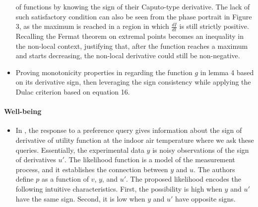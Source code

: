 \documentclass[11pt]{book}
\begin{document}
\begin{itemize}
of functions by knowing the sign of their Caputo-type derivative.
The lack of such satisfactory condition can also be seen from the
phase portrait in Figure 3, as the maximum is reached in a region
in which $\frac{dI}{dt}$ is still strictly positive. Recalling the
Fermat theorem on extremal points becomes an inequality in the non-local
context, justifying that, after the function reaches a maximum and
starts decreasing, the non-local derivative could still be non-negative.
\item Proving monotonicity properties in \cite{datta2021non}
regarding the function $g$ in lemma 4 based on its derivative sign,
then leveraging the sign consistency while applying the Dulac criterion
based on equation 16.
\end{itemize}
\paragraph{Well-being}
\begin{itemize}
\item In \cite{awalgaonkar2019learning},
the response to a preference query gives information about the sign
of derivative of utility function at the indoor air temperature where
we ask these queries. Essentially, the experimental data $y$ is noisy
observations of the sign of derivatives $u'$. The likelihood
function is a model of the measurement process, and it establishes
the connection between $y$ and $u$. The authors define $p$ as a
function of $v$, $y$, and $u'$. The proposed likelihood encodes
the following intuitive characteristics. First, the possibility is
high when $y$ and $u'$ have the same sign. Second, it is low when
$y$ and $u'$ have opposite signs.
\end{itemize}
\end{document}
